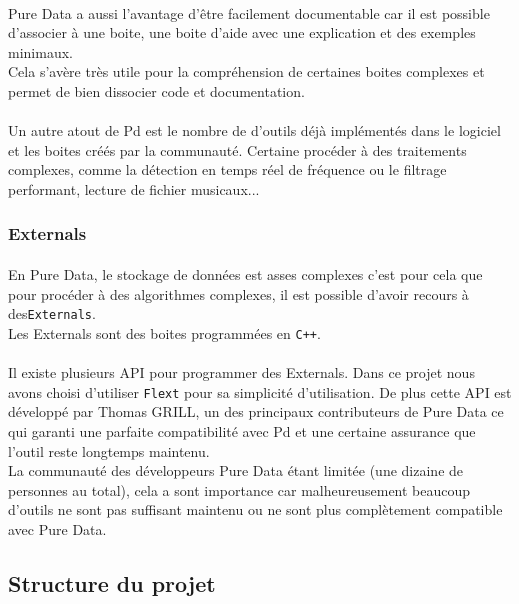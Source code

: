 \documentclass[a4paper, titlepage, oneside, 12pt]{article}%
\begin{document}
\paragraph{}
Pure Data a aussi l'avantage d'être facilement documentable car il est possible d'associer à une boite, une boite d'aide avec une explication et des exemples minimaux.\\
Cela s’avère très utile pour la compréhension de certaines boites complexes et permet de bien dissocier code et documentation.
\paragraph{}
Un autre atout de Pd est le nombre de d'outils déjà implémentés dans le logiciel et les boites créés par la communauté. Certaine procéder à des traitements complexes, comme la détection en temps réel de fréquence ou le filtrage performant, lecture de fichier musicaux...

\subsubsection{Externals}
\paragraph{}
En Pure Data, le stockage de données est asses complexes c'est pour cela que pour procéder à des algorithmes complexes, il est possible d'avoir recours à des\texttt{Externals}.\\
Les Externals sont des boites programmées en \texttt{C++}. 

\paragraph{}
Il existe plusieurs API pour programmer des Externals. Dans ce projet nous avons choisi d'utiliser \texttt{Flext} pour sa simplicité d'utilisation. De plus cette API est développé par Thomas GRILL, un des principaux contributeurs de Pure Data ce qui garanti une parfaite compatibilité avec Pd et une certaine assurance que l’outil reste longtemps maintenu. \\
La communauté des développeurs Pure Data étant limitée (une dizaine de personnes au total), cela a sont importance car malheureusement beaucoup d'outils ne sont pas suffisant maintenu ou ne sont plus complètement compatible avec Pure Data.  

\subsection{Structure du projet}
\end{document}
